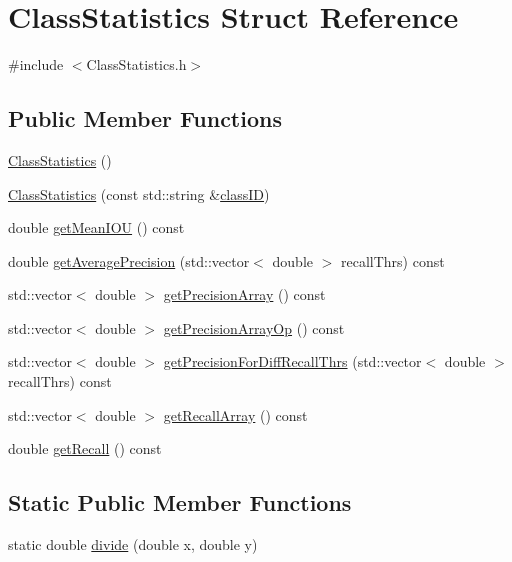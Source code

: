 \hypertarget{struct_class_statistics}{}\section{Class\+Statistics Struct Reference}
\label{struct_class_statistics}


{\ttfamily \#include $<$Class\+Statistics.\+h$>$}

\subsection*{Public Member Functions}
\begin{DoxyCompactItemize}
\item 
\hyperlink{struct_class_statistics_ac5a27388db5ca1d9283096020a9b1aeb}{Class\+Statistics} ()
\item 
\hyperlink{struct_class_statistics_a0434f553802cd8ea436164281184c8e7}{Class\+Statistics} (const std\+::string \&\hyperlink{struct_class_statistics_a4f06e2d800fde06ed4f6b77547d8dc06}{class\+ID})
\item 
double \hyperlink{struct_class_statistics_a22377aafdf557f655f500783fc5dc77f}{get\+Mean\+I\+OU} () const
\item 
double \hyperlink{struct_class_statistics_af97e1c498a387e6762be460e61d0e610}{get\+Average\+Precision} (std\+::vector$<$ double $>$ recall\+Thrs) const
\item 
std\+::vector$<$ double $>$ \hyperlink{struct_class_statistics_a33a90034e90af43aa97e1b46e9c8567f}{get\+Precision\+Array} () const
\item 
std\+::vector$<$ double $>$ \hyperlink{struct_class_statistics_a3fa2067c657166bcc5d6719575e64ddc}{get\+Precision\+Array\+Op} () const
\item 
std\+::vector$<$ double $>$ \hyperlink{struct_class_statistics_aa6b024d72444ea2b8d71f5f2a416655c}{get\+Precision\+For\+Diff\+Recall\+Thrs} (std\+::vector$<$ double $>$ recall\+Thrs) const
\item 
std\+::vector$<$ double $>$ \hyperlink{struct_class_statistics_ae8fc780d72aca26b4dfc5af5992cb41b}{get\+Recall\+Array} () const
\item 
double \hyperlink{struct_class_statistics_a4b189bb3822f02cca79dbe1b59fce7b5}{get\+Recall} () const
\end{DoxyCompactItemize}
\subsection*{Static Public Member Functions}
\begin{DoxyCompactItemize}
\item 
static double \hyperlink{struct_class_statistics_a66418a700e12730feb6ad54d81ba0a8e}{divide} (double x, double y)
\end{DoxyCompactItemize}
